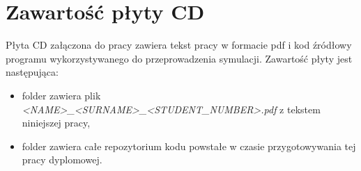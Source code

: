 \chapter{Zawartość płyty CD}
Płyta CD załączona do pracy zawiera tekst pracy w formacie pdf i kod źródłowy programu wykorzystywanego do przeprowadzenia symulacji.
Zawartość płyty jest następująca:
\begin{itemize}
\item folder  zawiera plik \textit{<NAME>\_<SURNAME>\_<STUDENT\_NUMBER>.pdf} z tekstem niniejszej pracy,

\item folder  zawiera całe repozytorium kodu powstałe w czasie przygotowywania tej pracy dyplomowej.
\end{itemize}

